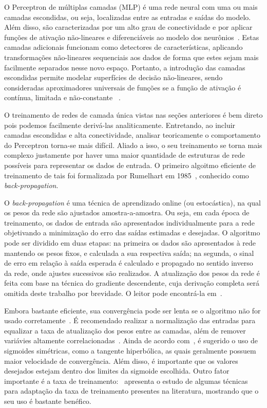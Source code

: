 \documentclass[conference]{IEEEtran}
\begin{document}
	O Perceptron de múltiplas camadas (MLP) é uma rede neural com uma ou mais camadas escondidas, ou seja, localizadas entre as entradas e saídas do modelo. Além disso, são caracterizadas por um alto grau de conectividade e por aplicar funções de ativação não-lineares e diferenciáveis ao modelo dos neurônios~\cite{haykin2007neural}. Estas camadas adicionais funcionam como detectores de características, aplicando transformações não-lineares sequenciais aos dados de forma que estes sejam mais facilmente separados nesse novo espaço. Portanto, a introdução das camadas escondidas permite modelar superfícies de decisão não-lineares, sendo consideradas aproximadores universais de funções se a função de ativação é contínua, limitada e não-constante ~\cite{hornik1989multilayer}.
		
	O treinamento de redes de camada única vistas nas seções anteriores é bem direto pois podemos facilmente derivá-las analiticamente. Entretando, ao incluir camadas escondidas e alta conectividade, analisar teoricamente o comportamento do Perceptron torna-se mais difícil. Aliado a isso, o seu treinamento se torna mais complexo justamente por haver uma maior quantidade de estruturas de rede possíveis para representar os dados de entrada. O primeiro algoitmo eficiente de treinamento de tais foi formalizada por Rumelhart em 1985~\cite{rumelhart1985learning}, conhecido como \textit{back-propagation}.    
	
	O \textit{back-propagation} é uma técnica de aprendizado online (ou estocástica), na qual os pesos da rede são ajustados amostra-a-amostra. Ou seja, em cada época de treinamento, os dados de entrada são apresentados individualmente para a rede objetivando a minimização do erro das saídas estimadas e desejadas. O algoritmo pode ser dividido em duas etapas: na primeira os dados são apresentados à rede mantendo os pesos fixos, e calculada a sua respectiva saída; na segunda, o sinal de erro em relação à saída esperada é calculado e propagado no sentido inverso da rede, onde ajustes sucessivos são realizados. A atualização dos pesos da rede é feita com base na técnica do gradiente descendente, cuja derivação completa será omitida deste trabalho por brevidade. O leitor pode encontrá-la em~\cite{rumelhart1985learning, haykin2007neural}. 
	
	Embora bastante eficiente, sua convergência pode ser lenta se o algoritmo não for usado corretamente~\cite{lecun1993efficient}. É recomendado realizar a normalização das entradas para equalizar a taxa de atualização dos pesos entre as camadas, além de remover variávies altamente correlacionadas~\cite{lecun2012efficient}. Ainda de acordo com~\cite{lecun2012efficient}, é sugerido o uso de sigmoides simétricas, como a tangente hiperbólica, as quais geralmente possuem maior velocidade de convergência. Além disso, é importante que os valores desejados estejam dentro dos limites da sigmoide escolhida. Outro fator importante é a taxa de treinamento:~\cite{magoulas1999improving} apresenta o estudo de algumas técnicas para adaptação da taxa de treinamento presentes na literatura, mostrando que o seu uso é bastante benéfico. 
	
\end{document}

